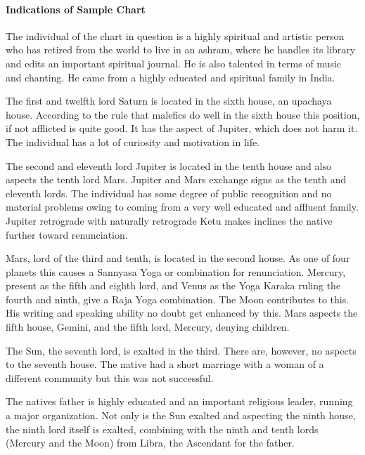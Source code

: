 \paragraph{Indications of Sample Chart}

 

The individual of the chart in question is a highly spiritual and artistic person who has retired from the world to live in an ashram, where he handles its library and edits an important spiritual journal. He is also talented in terms of music and chanting. He came from a highly educated and spiritual family in India.

 

The first and twelfth lord Saturn is located in the sixth house, an upachaya house. According to the rule that malefics do well in the sixth house this position, if not afflicted is quite good. It has the aspect of Jupiter, which does not harm it. The individual has a lot of curiosity and motivation in life.

 

The second and eleventh lord Jupiter is located in the tenth house and also aspects the tenth lord Mars. Jupiter and Mars exchange signs as the tenth and eleventh lords. The individual has some degree of public recognition and no material problems owing to coming from a very well educated and affluent family. Jupiter retrograde with naturally retrograde Ketu makes inclines the native further toward renunciation.

 

Mars, lord of the third and tenth, is located in the second house. As one of four planets this causes a Sannyasa Yoga or combination for renunciation. Mercury, present as the fifth and eighth lord, and Venus as the Yoga Karaka ruling the fourth and ninth, give a Raja Yoga combination. The Moon contributes to this. His writing and speaking ability no doubt get enhanced by this. Mars aspects the fifth house, Gemini, and the fifth lord, Mercury, denying children.

 

The Sun, the seventh lord, is exalted in the third. There are, however, no aspects to the seventh house. The native had a short marriage with a woman of a different community but this was not successful.

 

The natives father is highly educated and an important religious leader, running a major organization. Not only is the Sun exalted and aspecting the ninth house, the ninth lord itself is exalted, combining with the ninth and tenth lords (Mercury and the Moon) from Libra, the Ascendant for the father.

